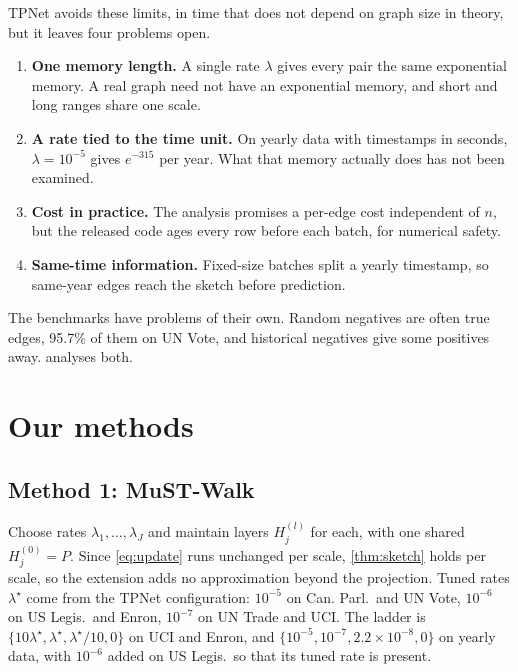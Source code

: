 \documentclass[11pt,a4paper]{article}
\theoremstyle{plain}
\theoremstyle{definition}
\begin{document}
TPNet avoids these limits, in time that does not depend on graph size in theory, but it leaves four problems open.
\begin{enumerate}\itemsep1pt
\item \textbf{One memory length.} A single rate $\lambda$ gives every pair the same exponential memory. A real graph need not have an exponential memory, and short and long ranges share one scale.
\item \textbf{A rate tied to the time unit.} On yearly data with timestamps in seconds, $\lambda=10^{-5}$ gives $e^{-315}$ per year. What that memory actually does has not been examined.
\item \textbf{Cost in practice.} The analysis promises a per-edge cost independent of $n$, but the released code ages every row before each batch, for numerical safety.
\item \textbf{Same-time information.} Fixed-size batches split a yearly timestamp, so same-year edges reach the sketch before prediction.
\end{enumerate}
The benchmarks have problems of their own. Random negatives are often true edges, 95.7\% of them on UN Vote, and historical negatives give some positives away.  analyses both.

\section{Our methods}\label{sec:method}
\subsection{Method 1: MuST-Walk}
Choose rates $\lambda_1,\dots,\lambda_J$ and maintain layers $H_j^{(l)}$ for each, with one shared $H_j^{(0)}=P$. Since \eqref{eq:update} runs unchanged per scale, \cref{thm:sketch} holds per scale, so the extension adds no approximation beyond the projection. Tuned rates $\lambda^\star$ come from the TPNet configuration: $10^{-5}$ on Can. Parl.\ and UN Vote, $10^{-6}$ on US Legis.\ and Enron, $10^{-7}$ on UN Trade and UCI. The ladder is $\{10\lambda^\star,\lambda^\star,\lambda^\star/10,0\}$ on UCI and Enron, and $\{10^{-5},10^{-7},2.2\times10^{-8},0\}$ on yearly data, with $10^{-6}$ added on US Legis.\ so that its tuned rate is present.
\end{document}

